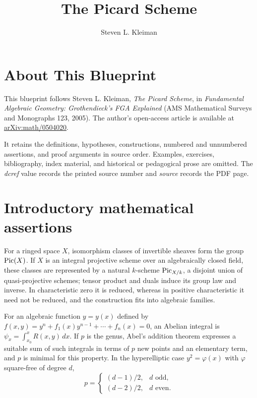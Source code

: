 \documentclass[11pt]{report}
\title{The Picard Scheme}
\author{Steven L. Kleiman}
\begin{document}
\maketitle
\tableofcontents
\chapter*{About This Blueprint}
This blueprint follows Steven L. Kleiman, \emph{The Picard Scheme}, in
\emph{Fundamental Algebraic Geometry: Grothendieck's FGA Explained} (AMS
Mathematical Surveys and Monographs 123, 2005).  The author's open-access
article is available at
\href{https://arxiv.org/pdf/math/0504020}{arXiv:math/0504020}.

It retains the definitions, hypotheses, constructions, numbered and unnumbered
assertions, and proof arguments in source order.  Examples, exercises,
bibliography, index material, and historical or pedagogical prose are omitted.
The \emph{dcref} value records the printed source number and \emph{source}
records the PDF page.
\chapter*{Introductory mathematical assertions}
\begin{remark}\label{kps-intro-assertions}
For a ringed space $X$, isomorphism classes of invertible sheaves form the
group $\operatorname{Pic}(X)$. If $X$ is an integral projective scheme over an algebraically
closed field, these classes are represented by a natural $k$-scheme
$\operatorname{Pic}_{X/k}$, a disjoint union of quasi-projective schemes; tensor product and
duals induce its group law and inverse. In characteristic zero it is reduced,
whereas in positive characteristic it need not be reduced, and the construction
fits into algebraic families.
\end{remark}
\begin{remark}
\label{kps-intro-abel-theorem}
For an algebraic function $y=y(x)$ defined by
$f(x,y)=y^n+f_1(x)y^{n-1}+\cdots+f_n(x)=0$, an Abelian integral is
$\psi_x=\int_{x_0}^xR(x,y)\,dx$. If $p$ is the genus, Abel's addition theorem
expresses a suitable sum of such integrals in terms of $p$ new points and an
elementary term, and $p$ is minimal for this property. In the hyperelliptic
case $y^2=\varphi(x)$ with $\varphi$ square-free of degree $d$,
\[
  p=\begin{cases}(d-1)/2,&d\text{ odd},\\(d-2)/2,&d\text{ even}.\end{cases}
\]
\end{remark}
\end{document}
